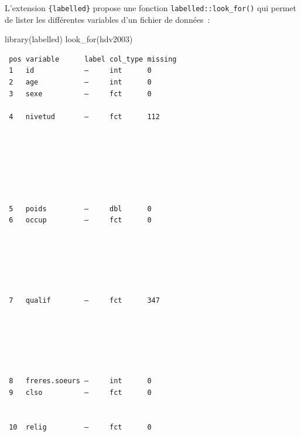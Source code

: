\documentclass[
  letterpaper,
  DIV=11,
  numbers=noendperiod,
  oneside]{scrreprt}
\newenvironment{Shaded}{\begin{snugshade}}{\end{snugshade}}
\newcommand{\FunctionTok}[1]{\textcolor[rgb]{0.28,0.35,0.67}{#1}}
\newcommand{\NormalTok}[1]{\textcolor[rgb]{0.00,0.23,0.31}{#1}}
\begin{document}
L'extension \texttt{\{labelled\}} propose une fonction
\texttt{labelled::look\_for()} qui permet de lister les différentes
variables d'un fichier de données~:

\begin{Shaded}
\begin{Highlighting}[]
\FunctionTok{library}\NormalTok{(labelled)}
\FunctionTok{look\_for}\NormalTok{(hdv2003)}
\end{Highlighting}
\end{Shaded}

\begin{verbatim}
 pos variable      label col_type missing
 1   id            —     int      0      
 2   age           —     int      0      
 3   sexe          —     fct      0      
                                         
 4   nivetud       —     fct      112    
                                         
                                         
                                         
                                         
                                         
                                         
                                         
 5   poids         —     dbl      0      
 6   occup         —     fct      0      
                                         
                                         
                                         
                                         
                                         
                                         
 7   qualif        —     fct      347    
                                         
                                         
                                         
                                         
                                         
                                         
 8   freres.soeurs —     int      0      
 9   clso          —     fct      0      
                                         
                                         
 10  relig         —     fct      0      
                                         
                                         
                                         

\end{verbatim}
\end{document}
